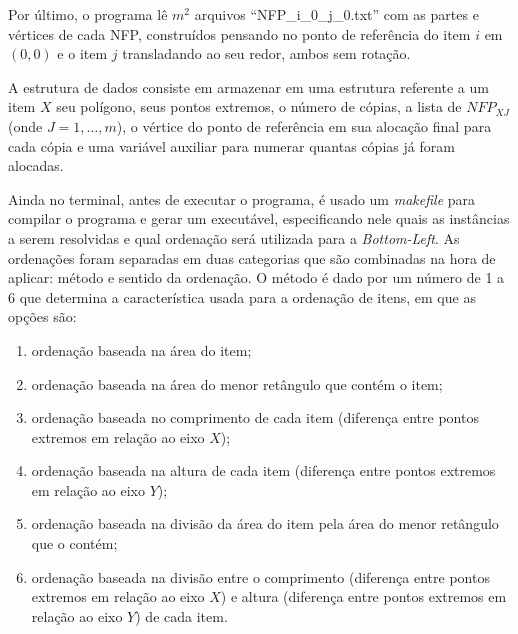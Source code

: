 \documentclass{article}
\begin{document}
Por último, o programa lê $m^2$ arquivos ``NFP\_i\_0\_j\_0.txt'' com as partes e vértices de cada NFP, construídos pensando no ponto de referência do item $i$ em $(0,0)$ e o item $j$ transladando ao seu redor, ambos sem rotação.

A estrutura de dados consiste em armazenar em uma estrutura referente a um item $X$ seu polígono, seus pontos extremos, o número de cópias, a lista de $NFP_{XJ}$ (onde $J = 1, \dots, m$), o vértice do ponto de referência em sua alocação final para cada cópia e uma variável auxiliar para numerar quantas cópias já foram alocadas.

Ainda no terminal, antes de executar o programa, é usado um {\it makefile} para compilar o programa e gerar um executável, especificando nele quais as instâncias a serem resolvidas e qual ordenação será utilizada para a {\it Bottom-Left}. As ordenações foram separadas em duas categorias que são combinadas na hora de aplicar: método e sentido da ordenação. O método é dado por um número de 1 a 6 que determina a característica usada para a ordenação de itens, em que as opções são:

\begin{enumerate}
    \item ordenação baseada na área do item;
    \item ordenação baseada na área do menor retângulo que contém o item;
    \item ordenação baseada no comprimento de cada item (diferença entre pontos extremos em relação ao eixo $X$);
    \item ordenação baseada na altura de cada item (diferença entre pontos extremos em relação ao eixo $Y$);
    \item ordenação baseada na divisão da área do item pela área do menor retângulo que o contém;
    \item ordenação baseada na divisão entre o comprimento (diferença entre pontos extremos em relação ao eixo $X$) e altura (diferença entre pontos extremos em relação ao eixo $Y$) de cada item.
\end{enumerate}
\end{document}
